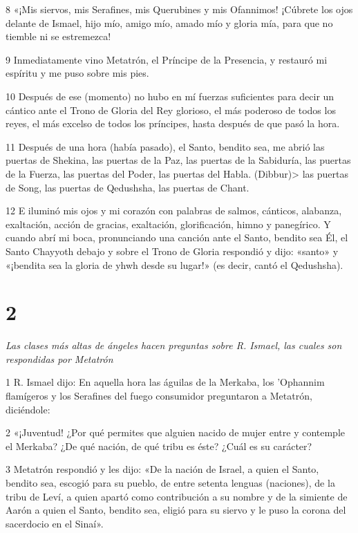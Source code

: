 \par 8 «¡Mis siervos, mis Serafines, mis Querubines y mis Ofannimos! ¡Cúbrete los ojos delante de Ismael, hijo mío, amigo mío, amado mío y gloria mía, para que no tiemble ni se estremezca!

\par 9 Inmediatamente vino Metatrón, el Príncipe de la Presencia, y restauró mi espíritu y me puso sobre mis pies.

\par 10 Después de ese (momento) no hubo en mí fuerzas suficientes para decir un cántico ante el Trono de Gloria del Rey glorioso, el más poderoso de todos los reyes, el más excelso de todos los príncipes, hasta después de que pasó la hora.

\par 11 Después de una hora (había pasado), el Santo, bendito sea, me abrió las puertas de Shekina, las puertas de la Paz, las puertas de la Sabiduría, las puertas de la Fuerza, las puertas del Poder, las puertas del Habla. (Dibbur)> las puertas de Song, las puertas de Qedushsha, las puertas de Chant.

\par 12 E iluminó mis ojos y mi corazón con palabras de salmos, cánticos, alabanza, exaltación, acción de gracias, exaltación, glorificación, himno y panegírico. Y cuando abrí mi boca, pronunciando una canción ante el Santo, bendito sea Él, el Santo Chayyoth debajo y sobre el Trono de Gloria respondió y dijo: «santo» y «¡bendita sea la gloria de yhwh desde su lugar!» (es decir, cantó el Qedushsha).

\chapter{2}

\par \textit{Las clases más altas de ángeles hacen preguntas sobre R. Ismael, las cuales son respondidas por Metatrón}

\par 1 R. Ismael dijo: En aquella hora las águilas de la Merkaba, los 'Ophannim flamígeros y los Serafines del fuego consumidor preguntaron a Metatrón, diciéndole:

\par 2 «¡Juventud! ¿Por qué permites que alguien nacido de mujer entre y contemple el Merkaba? ¿De qué nación, de qué tribu es éste? ¿Cuál es su carácter?

\par 3 Metatrón respondió y les dijo: «De la nación de Israel, a quien el Santo, bendito sea, escogió para su pueblo, de entre setenta lenguas (naciones), de la tribu de Leví, a quien apartó como contribución a su nombre y de la simiente de Aarón a quien el Santo, bendito sea, eligió para su siervo y le puso la corona del sacerdocio en el Sinaí».

